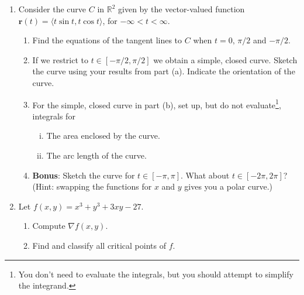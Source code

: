\documentclass[12pt]{article}
\newcommand{\points}[1]{\marginpar{\hspace{24pt}[#1]}}
\newcommand{\R}{\mathbb{R}}
\renewcommand{\r}{\mathbf{r}}
\begin{document}
\begin{enumerate}
\item Consider the curve $C$ in $\R^2$ given by the vector-valued function $\r(t)=\langle t\sin t,t\cos t\rangle$, for $-\infty<t<\infty$.
\begin{enumerate}
\item Find the equations of the tangent lines to $C$ when $t=0,\, \pi/2$ and $-\pi/2$.  \points{5}

\vspace{4in}

\item If we restrict to $t\in [-\pi/2,\pi/2]$ we obtain a simple, closed curve. Sketch the curve using your results from part (a). Indicate the orientation of the curve.  \points{3} 

\newpage

\item For the simple, closed curve in part (b), set up, but do not evaluate\footnote{You don't need to evaluate the integrals, but you should attempt to simplify the integrand.}, integrals for
\begin{enumerate}[(i)]
\item The area enclosed by the curve. \points{3}

\vspace{2.5in}

\item The arc length of the curve. \points{3}

\end{enumerate}
\vspace{2.5in}

\item {\bf Bonus}: Sketch the curve for $t\in [-\pi,\pi]$. What about $t\in [-2\pi,2\pi]$? \points{4} (Hint: swapping the functions for $x$ and $y$ gives you a polar curve.)

\end{enumerate}
\newpage

\item Let $f(x,y) = x^3+y^3+3xy-27$.
\begin{enumerate}
\item Compute $\nabla f(x,y)$. \points{2}

\vspace{1in}

\item Find and classify all critical points of $f$. \points{6}

\vspace{4in}


\end{enumerate}
\end{enumerate}
\end{document}
